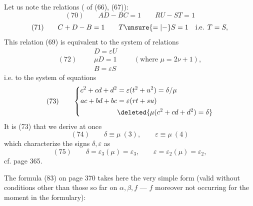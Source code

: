 Let us note the relations ( of (66), (67)):
\[
(70)\qquad AD-BC=1\qquad RU-ST=1
\]
\[
(71)\qquad C+D-B=1\qquad T\unsure{=|-}S=1\quad\text{i.e. }T=S,
\]
This  relation (69)  is equivalent to the system of relations
\[
(72)\qquad
\boxed{\begin{gathered}
D=\varepsilon U\\
\mu D=1\\
B=\varepsilon S
\end{gathered}}
\qquad(\text{where }\mu=2\nu+1),
\]
i.e. to the system of equations
\[
(73)\qquad
\left\{\begin{aligned}
c^2+cd+d^2&=\varepsilon(t^2+u^2)=\delta/\mu\\
ac+bd+bc&=\varepsilon(rt+su)\\
&\deleted{\mu(c^2+cd+d^2)=\delta}
\end{aligned}\right.
\]
It is   (73) that we derive at once
\[
(74)\qquad\delta\equiv\mu\ (3),\qquad\varepsilon\equiv\mu\ (4)
\]
which characterize the signs $\delta,\varepsilon$ as
\[
(75)\qquad\delta=\varepsilon_3(\mu)=\varepsilon_3,\qquad
\varepsilon=\varepsilon_2(\mu)=\varepsilon_2,
\]
cf.  page 365.

The formula (83) on page 370 takes here the very simple form (valid without conditions other than those  so far on $\alpha,\beta,f$ --- $f$ moreover not occurring  for the moment in the formulary):


